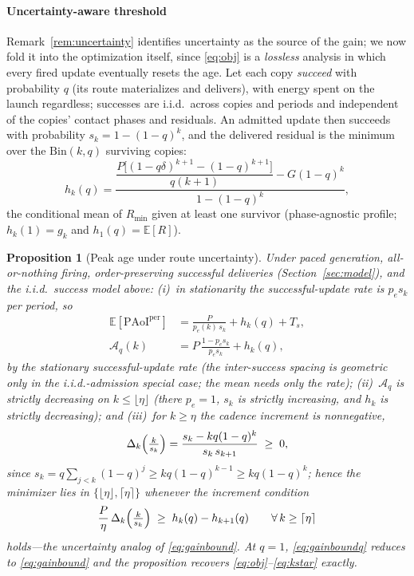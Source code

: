 \documentclass[twocolumn,3p,times,procedia]{elsarticle}
\newtheorem{proposition}{Proposition}
\newcommand{\PAoIper}{\mathrm{PAoI}^{\mathrm{per}}}
\newcommand{\E}{\mathbb{E}}
\newcommand{\peff}{p_e}
\begin{document}
\paragraph*{Uncertainty-aware threshold}
Remark~\ref{rem:uncertainty} identifies uncertainty as the source of the
gain; we now fold it into the optimization itself, since \eqref{eq:obj}
is a \emph{lossless} analysis in which every fired update eventually
resets the age. Let each
copy \emph{succeed} with probability $q$ (its route materializes and
delivers), with energy spent on the launch regardless; successes are
i.i.d.\ across copies and periods and independent of the copies'
contact phases and residuals.
An admitted update then succeeds with probability
$s_k=1-(1-q)^k$, and the delivered residual is the
minimum over the $\mathrm{Bin}(k,q)$ surviving copies:
\begin{equation}\label{eq:hq}
h_k(q)=\frac{\dfrac{P\bigl[(1-q\delta)^{k+1}-(1-q)^{k+1}\bigr]}{q(k+1)}
-G(1-q)^{k}}{1-(1-q)^{k}},
\end{equation}
the conditional mean of $R_{\min}$ given at least one survivor
(phase-agnostic profile; $h_k(1)=g_k$ and $h_1(q)=\E[R]$).

\begin{proposition}[Peak age under route uncertainty]\label{prop:uncertain}
Under paced generation, all-or-nothing firing, order-preserving
successful deliveries (Section~\ref{sec:model}), and the i.i.d.\
success model above:
(i)~in stationarity the successful-update rate is $\peff s_k$ per
period, so
\begin{equation}\label{eq:objq}
\begin{aligned}
\E[\PAoIper]&=\frac{P}{\peff(k)\,s_k}+h_k(q)+T_s,\\
\mathcal{A}_q(k)&=P\,\frac{1-\peff s_k}{\peff s_k}+h_k(q),
\end{aligned}
\end{equation}
by the stationary successful-update rate (the inter-success spacing is
geometric only in the
i.i.d.-admission special case; the \emph{mean} needs only the rate);
(ii)~$\mathcal{A}_q$ is strictly decreasing on $k\le\lfloor\eta\rfloor$
(there $\peff=1$, $s_k$ is strictly increasing, and $h_k$ is strictly
decreasing); and
(iii)~for $k\ge\eta$ the cadence increment is nonnegative,
\begin{equation}\label{eq:dphi}
\Delta_k\Bigl(\tfrac{k}{s_k}\Bigr)
=\frac{s_k-kq(1-q)^k}{s_k\,s_{k+1}}\;\ge\;0,
\end{equation}
since $s_k=q\sum_{j<k}(1-q)^j\ge kq(1-q)^{k-1}\ge kq(1-q)^k$; hence the
minimizer lies in $\{\lfloor\eta\rfloor,\lceil\eta\rceil\}$ whenever the
increment condition
\begin{equation}\label{eq:gainboundq}
\frac{P}{\eta}\,\Delta_k\Bigl(\tfrac{k}{s_k}\Bigr)\;\ge\;
h_k(q)-h_{k+1}(q)\qquad\forall\,k\ge\lceil\eta\rceil
\end{equation}
holds---the uncertainty analog of \eqref{eq:gainbound}. At $q=1$,
\eqref{eq:gainboundq} reduces to \eqref{eq:gainbound} and the
proposition recovers \eqref{eq:obj}--\eqref{eq:kstar} exactly.
\end{proposition}
\end{document}
